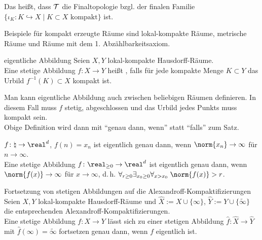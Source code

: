 \begin{Bem}
    Das heißt, dass $\mathcal{T}$ die Finaltopologie bzgl. der finalen Familie \\
    $\{\iota_K\colon K \hookrightarrow X \;|\; K \subset X \text{ kompakt}\}$
    ist.
\end{Bem}

\begin{Bsp}
    Beispiele für kompakt erzeugte Räume sind lokal-kompakte Räume,
    metrische Räume und Räume mit dem 1. Abzählbarkeitsaxiom.
\end{Bsp}

\linie

\begin{Def}{eigentliche Abbildung}
    Seien $X, Y$ lokal-kompakte Hausdorff-Räume. \\
    Eine stetige Abbildung $f\colon X \rightarrow Y$ heißt
    , falls für jede kompakte Menge $K \subset Y$
    das Urbild $f^{-1}(K) \subset X$ kompakt ist.
\end{Def}

\begin{Bem}
    Man kann eigentliche Abbildung auch zwischen beliebigen Räumen definieren.
    In diesem Fall muss $f$ stetig, abgeschlossen und das Urbild jedes
    Punkts muss kompakt sein. \\
    Obige Definition wird dann mit "`genau dann, wenn"' statt "`falls"'
    zum Satz.
\end{Bem}

\begin{Bsp}
    $f\colon \natural \rightarrow \real^d$, $f(n) = x_n$ ist eigentlich
    genau dann, wenn $\norm{x_n} \to \infty$ für $n \to \infty$. \\
    Eine stetige Abbildung $f\colon \real_{\ge 0} \rightarrow \real^d$ ist
    eigentlich genau dann, wenn
    $\norm{f(x)} \to \infty$ für $x \to \infty$, d.\,h.
    $\forall_{r \ge 0} \exists_{x_0 \ge 0}
    \forall_{x > x_0}\; \norm{f(x)} > r$.
\end{Bsp}

\begin{Satz}{Fortsetzung von stetigen Abbildungen auf die
             Alexandroff-Kompaktifizierungen}\\
    Seien $X, Y$ lokal-kompakte Hausdorff-Räume und
    $\widehat{X} := X \cup \{\infty\}$,
    $\widehat{Y} := Y \cup \{\widetilde{\infty}\}$
    die entsprechenden Alexandroff-Kompaktifizierungen. \\
    Eine stetige Abbildung $f\colon X \rightarrow Y$ lässt sich zu einer
    stetigen Abbildung $\widehat{f}\colon \widehat{X} \rightarrow \widehat{Y}$
    mit $\widehat{f}(\infty) = \widetilde{\infty}$ fortsetzen genau dann, wenn
    $f$ eigentlich ist.
\end{Satz}

